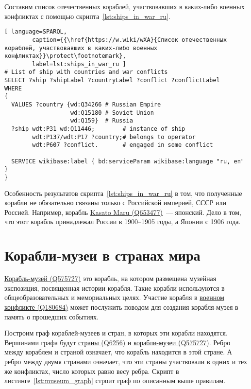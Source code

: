 Составим список отечественных кораблей, участвовавших в каких-либо военных конфликтах с помощью скрипта~\ref{lst:ships_in_war_ru}.

\begin{lstlisting}[ language=SPARQL, 
        caption={{\href{https://w.wiki/wXA}{Список отечественных кораблей, участвовавших в каких-либо военных конфликтах}}\protect\footnotemark}, 
        label=lst:ships_in_war_ru ]
# List of ship with countries and war conflicts
SELECT ?ship ?shipLabel ?countryLabel ?conflict ?conflictLabel
WHERE
{
  VALUES ?country {wd:Q34266 # Russian Empire
                   wd:Q15180 # Soviet Union
                   wd:Q159}  # Russia
  ?ship wdt:P31 wd:Q11446;        # instance of ship
        wdt:P137/wdt:P17 ?country;# belongs to operator
        wdt:P607 ?conflict.       # engaged in some conflict

  SERVICE wikibase:label { bd:serviceParam wikibase:language "ru, en" }
}
\end{lstlisting}

Особенность результатов скрипта~\ref{lst:ships_in_war_ru} в том, 
что полученные корабли не обязательно связаны только с Российской империей, 
СССР или Россией. 
Например, корабль \href{https://www.wikidata.org/wiki/Q653477}{Kasato Maru (Q653477)}~--- японский. 
Дело в том, что этот корабль принадлежал России в 1900--1905 годы, а Японии с 1906 года.


\section{Корабли-музеи в странах мира}

\href{https://www.wikidata.org/wiki/Q575727}{Корабль-музей (Q575727)} это корабль, на котором размещена музейная экспозиция, посвященная истории корабля. Такие корабли используются в общеобразовательных и мемориальных целях. Участие корабля в \href{https://www.wikidata.org/wiki/Q180684}{военном конфликте (Q180684)} может послужить поводом для создания корабля-музея в память о прошедших событиях. 

Построим граф кораблей-музеев и стран, в которых эти корабли находятся. Вершинами графа будут \href{https://www.wikidata.org/wiki/Q6256}{страны (Q6256)} и \href{https://www.wikidata.org/wiki/Q575727}{корабли-музеи (Q575727)}. Ребро между кораблем и страной означает, что корабль находится в этой стране. А ребро между двумя странами означает, что эти страны участвовали в одних и тех же конфликтах, число которых равно весу ребра. Скрипт в листинге~\ref{lst:museum_graph} строит граф по описанным выше правилам.

